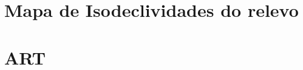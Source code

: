 \chapter{Mapa de Isodeclividades do relevo}
\label{chap:decliv}
\clearpage

%

\chapter{ART}
\label{chap:art}
\clearpage

